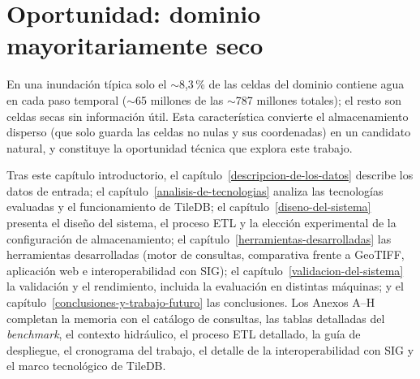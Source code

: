 \section{Oportunidad: dominio mayoritariamente seco}\label{oportunidad-sparse}

En una inundación típica solo el $\sim$8,3\,\% de las celdas del dominio contiene agua en cada paso temporal ($\sim$65 millones de las $\sim$787 millones totales); el resto son celdas secas sin información útil. Esta característica convierte el almacenamiento disperso (que solo guarda las celdas no nulas y sus coordenadas) en un candidato natural, y constituye la oportunidad técnica que explora este trabajo.

Tras este capítulo introductorio, el capítulo~\ref{descripcion-de-los-datos} describe los datos de entrada; el capítulo~\ref{analisis-de-tecnologias} analiza las tecnologías evaluadas y el funcionamiento de TileDB; el capítulo~\ref{diseno-del-sistema} presenta el diseño del sistema, el proceso ETL y la elección experimental de la configuración de almacenamiento; el capítulo~\ref{herramientas-desarrolladas} las herramientas desarrolladas (motor de consultas, comparativa frente a GeoTIFF, aplicación web e interoperabilidad con SIG); el capítulo~\ref{validacion-del-sistema} la validación y el rendimiento, incluida la evaluación en distintas máquinas; y el capítulo~\ref{conclusiones-y-trabajo-futuro} las conclusiones. Los Anexos A--H completan la memoria con el catálogo de consultas, las tablas detalladas del \textit{benchmark}, el contexto hidráulico, el proceso ETL detallado, la guía de despliegue, el cronograma del trabajo, el detalle de la interoperabilidad con SIG y el marco tecnológico de TileDB.

